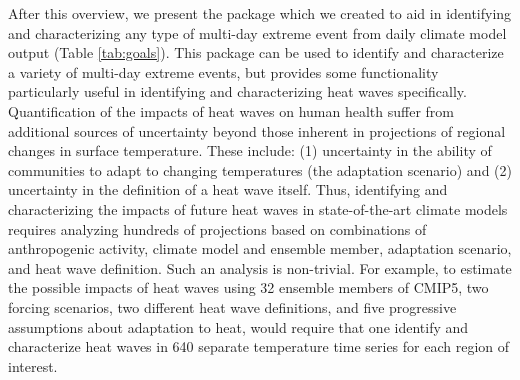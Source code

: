 After this overview, we present the  package which
we created to aid in identifying and characterizing any type of
multi-day extreme event from daily climate model output (Table
\ref{tab:goals}). This package can be used to identify and characterize
a variety of multi-day extreme events, but provides some functionality
particularly useful in identifying and characterizing heat waves
specifically. Quantification of the impacts of heat waves on human
health suffer from additional sources of uncertainty beyond those
inherent in projections of regional changes in surface temperature.
These include: (1) uncertainty in the ability of communities to adapt to
changing temperatures (the adaptation scenario) and (2) uncertainty in
the definition of a heat wave itself. Thus, identifying and
characterizing the impacts of future heat waves in state-of-the-art
climate models requires analyzing hundreds of projections based on
combinations of anthropogenic activity, climate model and ensemble
member, adaptation scenario, and heat wave definition. Such an analysis
is non-trivial. For example, to estimate the possible impacts of heat
waves using 32 ensemble members of CMIP5, two forcing scenarios, two
different heat wave definitions, and five progressive assumptions about
adaptation to heat, would require that one identify and characterize
heat waves in 640 separate temperature time series for each region of
interest.

